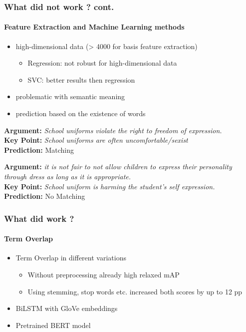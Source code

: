 \documentclass[english,handout]{mlutalk}
\begin{document}
\begin{frame}
  \frametitle{What did not work ? cont. }
  \framesubtitle{Feature Extraction and Machine Learning methods}
    
    	\begin{itemize}
      \item high-dimensional data (> 4000 for basis feature extraction)
      	\begin{itemize}
      		\item Regression: not robust for high-dimensional data
      		\item SVC: better results then regression
      	\end{itemize}
	\end{itemize}
	
    \begin{itemize}
      \item problematic with semantic meaning
      \item prediction based on the existence of words
	\end{itemize}
   
    \begin{example}
      \textbf{Argument:} \textit{School uniforms violate the right to freedom of expression.}\\
      \textbf{Key Point:} \textit{School uniforms are often uncomfortable/sexist}\\
      \textbf{Prediction:} Matching
    \end{example}
    
     \begin{example}
      \textbf{Argument:} \textit{it is not fair to not allow children to express their personality through dress as long as it is appropriate.}\\
      \textbf{Key Point:} \textit{School uniform is harming the student's self expression.}\\
      \textbf{Prediction:} No Matching
    \end{example}

\end{frame}

\begin{frame}
  \frametitle{What did work ?}
  \framesubtitle{Term Overlap}
    
    \begin{itemize}
      \item Term Overlap in different variations
      \begin{itemize}
        \item Without preprocessing already high relaxed mAP
        \item Using stemming, stop words etc. increased both scores by up to 12 pp 
      \end{itemize} 
      \item BiLSTM with GloVe embeddings
      \item Pretrained BERT model
    \end{itemize}

\end{frame}
\end{document}
